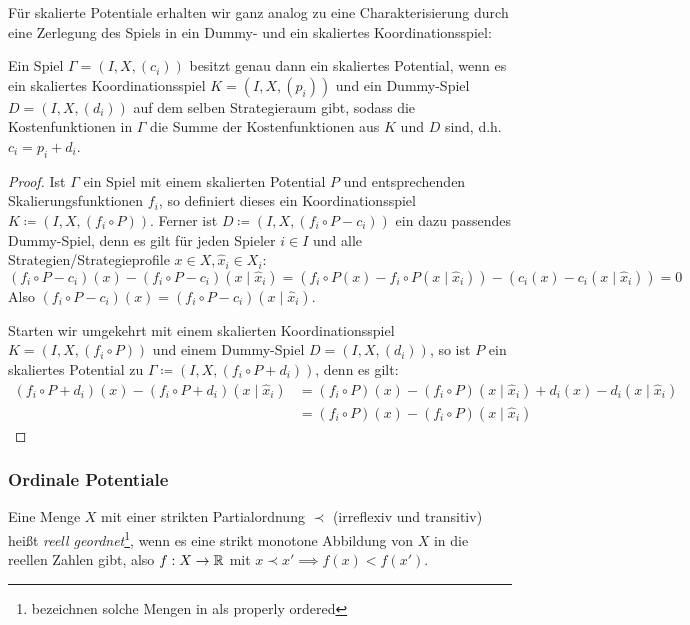 Für skalierte Potentiale erhalten wir ganz analog zu  eine Charakterisierung durch eine Zerlegung des Spiels in ein Dummy- und ein skaliertes Koordinationsspiel:

\begin{satz}\label{satz:CharSkalPot}
	Ein Spiel $\Gamma = (I, X, (c_i))$ besitzt genau dann ein skaliertes Potential, wenn es ein skaliertes Koordinationsspiel $K = (I, X, (p_i))$ und ein Dummy-Spiel $D = (I, X, (d_i))$ auf dem selben Strategieraum gibt, sodass die Kostenfunktionen in $\Gamma$ die Summe der Kostenfunktionen aus $K$ und $D$ sind, d.h. $c_i = p_i + d_i$.
\end{satz}

\begin{proof}
	Ist $\Gamma$ ein Spiel mit einem skalierten Potential $P$ und entsprechenden Skalierungsfunktionen $f_i$, so definiert dieses ein Koordinationsspiel $K \coloneqq (I, X, (f_i \circ P))$. Ferner ist $D \coloneqq (I, X, (f_i\circ P-c_i))$ ein dazu passendes Dummy-Spiel, denn es gilt für jeden Spieler $i \in I$ und alle Strategien/Strategieprofile $x \in X, \hat{x}_i \in X_i$:
	\[(f_i\circ P-c_i)(x) - (f_i\circ P-c_i)(x \mid \hat{x}_i) = \left(f_i\circ P(x) - f_i\circ P(x \mid \hat{x}_i)\right) - \left(c_i(x) - c_i(x \mid \hat{x}_i)\right) = 0 \]
	Also $(f_i\circ P-c_i)(x) = (f_i\circ P-c_i)(x \mid \hat{x}_i)$.
	
	Starten wir umgekehrt mit einem skalierten Koordinationsspiel $K = (I, X, (f_i \circ P))$ und einem Dummy-Spiel $D = (I, X, (d_i))$, so ist $P$ ein skaliertes Potential zu $\Gamma \coloneqq (I, X, (f_i\circ P + d_i))$, denn es gilt:
		\begin{align*}
			(f_i\circ P + d_i)(x) - (f_i\circ P + d_i)(x \mid \hat{x}_i) &= (f_i\circ P)(x) - (f_i\circ P)(x \mid \hat{x}_i) + d_i(x) - d_i(x \mid \hat{x}_i) \\
				&= (f_i\circ P)(x) - (f_i\circ P)(x \mid \hat{x}_i)
		\end{align*}
\end{proof}


\subsubsection{Ordinale Potentiale}

\begin{defn}
	Eine Menge $X$ mit einer strikten Partialordnung $\prec$ (irreflexiv und transitiv) heißt \emph{reell geordnet}\footnote{\citeauthor{CharExOrdPot} bezeichnen solche Mengen in \cite{CharExOrdPot} als \glqq properly ordered\grqq}, wenn es eine strikt monotone Abbildung von $X$ in die reellen Zahlen gibt, also $f: X \to \mathbb{R}$ mit $x \prec x' \implies f(x) < f(x')$.
\end{defn}

